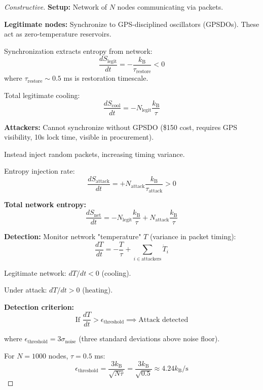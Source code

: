 \documentclass[twocolumn,10pt]{article}
\theoremstyle{definition}
\theoremstyle{remark}
\newcommand{\kB}{k_{\text{B}}}
\begin{document}
\begin{proof}[Constructive]
\textbf{Setup:} Network of $N$ nodes communicating via packets.

\vspace{0.2cm}
\noindent\textbf{Legitimate nodes:} Synchronize to GPS-disciplined oscillators (GPSDOs). These act as zero-temperature reservoirs\cite{vinnicombe2013}.

Synchronization extracts entropy from network:
\begin{equation}
\frac{dS_{\text{legit}}}{dt} = -\frac{\kB}{\tau_{\text{restore}}} < 0
\end{equation}
where $\tau_{\text{restore}} \sim 0.5$ ms is restoration timescale.

Total legitimate cooling:
\begin{equation}
\frac{dS_{\text{cool}}}{dt} = -N_{\text{legit}} \frac{\kB}{\tau}
\end{equation}

\vspace{0.2cm}
\noindent\textbf{Attackers:} Cannot synchronize without GPSDO (\$150 cost, requires GPS visibility, 10s lock time, visible in procurement).

Instead inject random packets, increasing timing variance.

Entropy injection rate:
\begin{equation}
\frac{dS_{\text{attack}}}{dt} = +N_{\text{attack}} \frac{\kB}{\tau_{\text{attack}}} > 0
\end{equation}

\vspace{0.2cm}
\noindent\textbf{Total network entropy:}
\begin{equation}
\frac{dS_{\text{net}}}{dt} = -N_{\text{legit}} \frac{\kB}{\tau} + N_{\text{attack}} \frac{\kB}{\tau}
\end{equation}

\vspace{0.2cm}
\noindent\textbf{Detection:} Monitor network "temperature" $T$ (variance in packet timing):
\begin{equation}
\frac{dT}{dt} = -\frac{T}{\tau} + \sum_{i \in \text{attackers}} \dot{T}_i
\end{equation}

Legitimate network: $dT/dt < 0$ (cooling).

Under attack: $dT/dt > 0$ (heating).

\textbf{Detection criterion:}
\begin{equation}
\text{If } \frac{dT}{dt} > \epsilon_{\text{threshold}} \implies \text{Attack detected}
\end{equation}

where $\epsilon_{\text{threshold}} = 3\sigma_{\text{noise}}$ (three standard deviations above noise floor).

For $N=1000$ nodes, $\tau = 0.5$ ms:
\begin{equation}
\epsilon_{\text{threshold}} = \frac{3\kB}{\sqrt{N\tau}} = \frac{3\kB}{\sqrt{0.5}} \approx 4.24\kB/\text{s}
\end{equation}
\end{proof}
\end{document}
